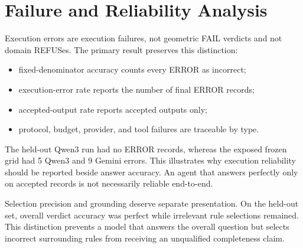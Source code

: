 \documentclass[10pt,twocolumn]{article}
\begin{document}
\section{Failure and Reliability Analysis}
Execution errors are execution failures, not geometric FAIL verdicts and not
domain REFUSes. The primary result preserves this distinction:
\begin{itemize}[leftmargin=*,itemsep=1pt]
\item fixed-denominator accuracy counts every ERROR as incorrect;
\item execution-error rate reports the number of final ERROR records;
\item accepted-output rate reports accepted outputs only;
\item protocol, budget, provider, and tool failures are traceable by type.
\end{itemize}

The held-out Qwen3 run had no ERROR records, whereas the exposed frozen grid had
5 Qwen3 and 9 Gemini errors. This illustrates why execution reliability should be
reported beside answer accuracy. An agent that answers perfectly only on accepted
records is not necessarily reliable end-to-end.

Selection precision and grounding deserve separate presentation. On the held-out
set, overall verdict accuracy was perfect while irrelevant rule selections remained.
This distinction prevents a model that answers the overall question but selects
incorrect surrounding rules from receiving an unqualified completeness claim.

\clearpage
\end{document}
